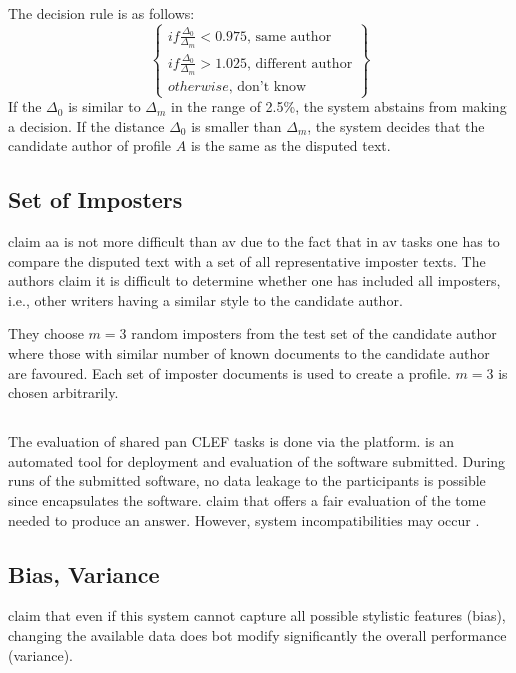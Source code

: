 The decision rule is as follows:
$$\left\{ \begin{matrix}
if \frac{\Delta_0}{\Delta_m} < 0.975 \text{, same author} \\
if \frac{\Delta_0}{\Delta_m} > 1.025 \text{, different author}\\
otherwise \text{, don't know}
\end{matrix}\right\}$$
If the $\Delta_0$ is similar to $\Delta_m$ in the range of 2.5\%, the system abstains from making a decision.
If the distance $\Delta_0$ is smaller than $\Delta_m$, the system decides that the candidate author of profile $A$ is the same as the disputed text.

\subsection{Set of Imposters}

\citet{kocher_unine_2015} claim \ac{aa} is not more difficult than \ac{av} 
due to the fact that in \ac{av} tasks one has to compare the disputed text with a set of all representative imposter texts.
The authors claim it is difficult to determine whether one has included all imposters, 
i.e., other writers having a similar style to the candidate author.

They choose $m=3$ random imposters from the test set of the candidate author 
where those with similar number of known documents to the candidate author are favoured.
Each set of imposter documents is used to create a profile.
$m=3$ is chosen arbitrarily.

\subsection{\tira{}}
\label{sec:tira}

The evaluation of shared \ac{pan} CLEF tasks is done via the \tira{} platform.
\tira{} is an automated tool for deployment and evaluation of the software submitted.
During runs of the submitted software, no data leakage to the participants is possible since \tira{} encapsulates the software.
\citet{kocher_unine_2015} claim that \tira{} offers a fair evaluation of the tome needed to produce an answer.
However, system incompatibilities may occur \cite{kocher_unine_2015}.

\subsection{Bias, Variance}
\citet{kocher_unine_2015} claim that even if this system cannot capture all possible stylistic features (bias), 
changing the available data does bot modify significantly the overall performance (variance).

